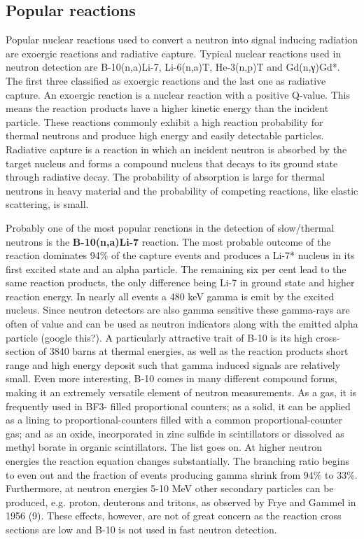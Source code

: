 \subsection{Popular reactions}
Popular nuclear reactions used to convert a neutron into signal inducing radiation are exoergic reactions and radiative capture. Typical nuclear reactions used in neutron detection are B-10(n,a)Li-7, Li-6(n,a)T, He-3(n,p)T and Gd(n,γ)Gd*. The first three classified as exoergic reactions and the last one as radiative capture.
An exoergic reaction is a nuclear reaction with a positive Q-value. This means the reaction products have a higher kinetic energy than the incident particle. These reactions commonly exhibit a high reaction probability for thermal neutrons and produce high energy and easily detectable particles.
Radiative capture is a reaction in which an incident neutron is absorbed by the target nucleus and forms a compound nucleus that decays to its ground state through radiative decay. The probability of absorption is large for thermal neutrons in heavy material and the probability of competing reactions, like elastic scattering, is small. \newline

Probably one of the most popular reactions in the detection of slow/thermal neutrons is the {\bf B-10(n,a)Li-7} reaction. The most probable outcome of the reaction dominates 94\% of the capture events and produces a Li-7* nucleus in its first excited state and an alpha particle. The remaining six per cent lead to the same reaction products, the only difference being Li-7 in ground state and higher reaction energy.
In nearly all events a 480 keV gamma is emit by the excited nucleus. Since neutron detectors are also gamma sensitive these gamma-rays are often of value and can be used as neutron indicators along with the emitted alpha particle (google this?).
A particularly attractive trait of B-10 is its high cross-section of 3840 barns at thermal energies, as well as the reaction products short range and high energy deposit such that gamma induced signals are relatively small. Even more interesting, B-10 comes in many different compound forms, making it an extremely versatile element of neutron measurements. As a gas, it is frequently used in BF3- filled proportional counters; as a solid, it can be applied as a lining to proportional-counters filled with a common proportional-counter gas; and as an oxide, incorporated in zinc sulfide in scintillators or dissolved as methyl borate in organic scintillators. The list goes on.
At higher neutron energies the reaction equation changes substantially. The branching ratio begins to even out and the fraction of events producing gamma shrink from 94\% to 33\%. Furthermore, at neutron energies 5-10 MeV other secondary particles can be produced, e.g. proton, deuterons and tritons, as observed by Frye and Gammel in 1956 (9). These effects, however, are not of great concern as the reaction cross sections are low and B-10 is not used in fast neutron detection. \newline

